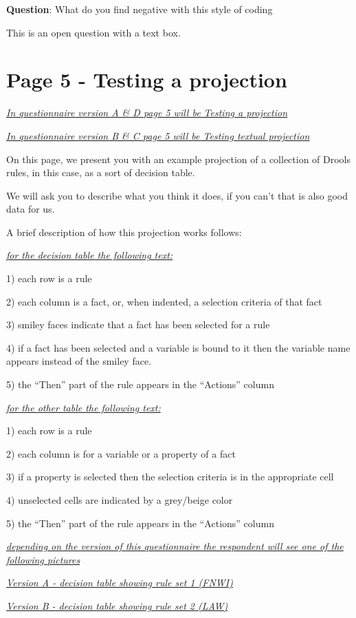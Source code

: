 \textbf{Question}: What do you find negative with this style of coding

This is an open question with a text box.

\section{Page 5 - Testing a projection}
\emph{\underline{In questionnaire version A \& D page 5 will be Testing a projection}}

\emph{\underline{In questionnaire version B \& C page 5 will be Testing textual projection}}

On this page, we present you with an example projection of a collection of Drools rules, in this case, as a sort of decision table.

We will ask you to describe what you think it does, if you can't that is also good data for us.

A brief description of how this projection works follows:

\emph{\underline{for the decision table the following text:}}

1) each row is a rule

2) each column is a fact, or, when indented, a selection criteria of that fact

3) smiley faces indicate that a fact has been selected for a rule

4) if a fact has been selected and a variable is bound to it then the variable name appears instead of the smiley face.

5) the ``Then'' part of the rule appears in the ``Actions'' column

\emph{\underline{for the other table the following text:}}

1) each row is a rule

2) each column is for a variable or a property of a fact

3) if a property is selected then the selection criteria is in the appropriate cell

4) unselected cells are indicated by a grey/beige color

5) the ``Then'' part of the rule appears in the ``Actions'' column


\emph{\underline{depending on the version of this questionnaire the respondent will see one of the following pictures}}

\emph{\underline{Version A - decision table showing rule set 1 (FNWI)}}

\emph{\underline{Version B - decision table showing rule set 2 (LAW)}}


